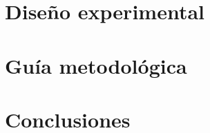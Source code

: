 \documentclass[12pt, twoside]{report}
\begin{document}
\chapter{Diseño experimental}
\label{cap:diseno-experimental}


\chapter{Guía metodológica}
\label{cap:guia-metodologica}


\chapter{Conclusiones}
\label{cap:conclusiones}


%
%
%

%
%
%
%
%
%
%
%
%
%
%
%



\end{document}
